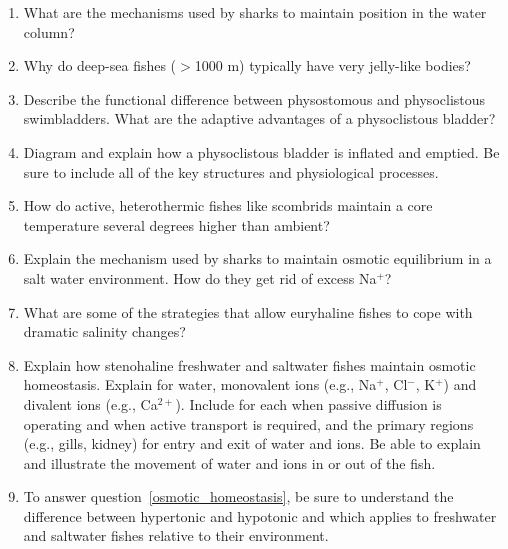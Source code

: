 \documentclass[letterpaper]{tufte-handout}
\begin{document}
\begin{enumerate}
	\item What are the mechanisms used by sharks to maintain position in the water column?

	\item Why do deep-sea fishes ($>$1000 m) typically have very jelly-like bodies?

	\item Describe the functional difference between physostomous and physoclistous swimbladders.  What are the adaptive advantages of a physoclistous bladder?

	\item Diagram and explain how a physoclistous bladder is inflated and emptied. Be sure to include all of the key structures and physiological processes.

	\item How do active, heterothermic fishes like scombrids maintain a core temperature several degrees higher than ambient?


	\item Explain the mechanism used by sharks to maintain osmotic equilibrium in a salt water environment. How do they get rid of excess Na$^+$?

	\item What are some of the strategies that allow euryhaline fishes to cope with dramatic salinity changes?
	
	\item\label{osmotic_homeostasis} Explain how stenohaline freshwater and saltwater fishes maintain osmotic homeostasis.  Explain for water, monovalent ions (e.g., Na$^+$, Cl$^-$, K$^+$) and divalent ions (e.g., Ca$^{2+}$).  Include for each when passive diffusion is operating and when active transport is required, and the primary regions (e.g., gills, kidney) for entry and exit of water and ions.  Be able to explain and illustrate the movement of water and ions in or out of the fish.
	
	\item To answer question~\ref{osmotic_homeostasis}, be sure to understand the difference between hypertonic and hypotonic and which applies to freshwater and saltwater fishes relative to their environment.
\end{enumerate}
\end{document}
